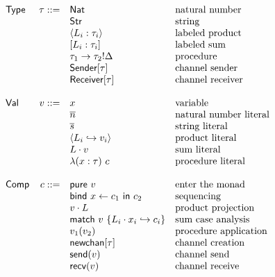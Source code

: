 \documentclass[12pt]{article}
\begin{document}
\[
\begin{array}{l r l l}
\textsf{Type}   &   \tau ::= & \textsf{Nat}                      & \text{natural number} \\
                &            & \textsf{Str}                      & \text{string} \\
                &            & \langle L_i : \tau_i \rangle      & \text{labeled product} \\
                &            & [ L_i : \tau_i ]                  & \text{labeled sum} \\
                &            & \tau_1 \rightarrow \tau_2!\Delta  & \text{procedure} \\
                &            & \textsf{Sender}[\tau]             & \text{channel sender} \\
                &            & \textsf{Receiver}[\tau]           & \text{channel receiver} \\
\\
\textsf{Val}    &      v ::= & x                                 & \text{variable} \\
                &            & \overline{n}                      & \text{natural number literal} \\
                &            & \overline{s}                      & \text{string literal} \\
                &            & \langle
                               L_i \hookrightarrow v_i
                               \rangle                           & \text{product literal} \\
                &            & L \cdot v                         & \text{sum literal} \\
                &            & \lambda (x : \tau) \ c            & \text{procedure literal} \\
\\
\textsf{Comp}   &      c ::= & \textsf{pure} \ v                 & \text{enter the monad} \\
                &            & \textsf{bind} \ x \leftarrow c_1
                               \ \textsf{in} \ c_2               & \text{sequencing} \\
                &            & v \cdot L                         & \text{product projection} \\
                &            & \textsf{match} \ v \ \{
                               L_i \cdot x_i \hookrightarrow c_i
                               \}                                & \text{sum case analysis} \\
                &            & v_1 (v_2)                         & \text{procedure application} \\
                &            & \textsf{newchan}[\tau]            & \text{channel creation} \\
                &            & \textsf{send}(v)                  & \text{channel send} \\
                &            & \textsf{recv}(v)                  & \text{channel receive} \\
\end{array}
\]
\end{document}
